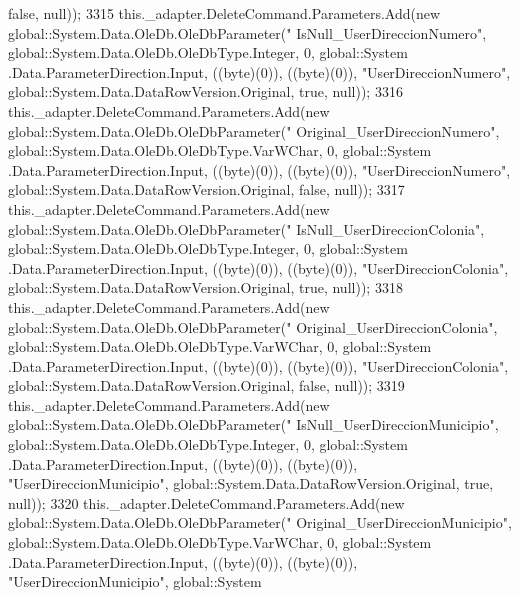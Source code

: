 \begin{DoxyCode}
{      false}, null));
3315             this.\_adapter.DeleteCommand.Parameters.Add(\textcolor{keyword}{new} global::System.Data.OleDb.OleDbParameter(\textcolor{stringliteral}{"
      IsNull\_UserDireccionNumero"}, global::System.Data.OleDb.OleDbType.Integer, 0, global::System
      .Data.ParameterDirection.Input, ((byte)(0)), ((byte)(0)), \textcolor{stringliteral}{"UserDireccionNumero"}, global::System.Data.DataRowVersion.Original, \textcolor{keyword}{true},
       null));
3316             this.\_adapter.DeleteCommand.Parameters.Add(\textcolor{keyword}{new} global::System.Data.OleDb.OleDbParameter(\textcolor{stringliteral}{"
      Original\_UserDireccionNumero"}, global::System.Data.OleDb.OleDbType.VarWChar, 0, global::System
      .Data.ParameterDirection.Input, ((byte)(0)), ((byte)(0)), \textcolor{stringliteral}{"UserDireccionNumero"}, global::System.Data.DataRowVersion.Original, \textcolor{keyword}{
      false}, null));
3317             this.\_adapter.DeleteCommand.Parameters.Add(\textcolor{keyword}{new} global::System.Data.OleDb.OleDbParameter(\textcolor{stringliteral}{"
      IsNull\_UserDireccionColonia"}, global::System.Data.OleDb.OleDbType.Integer, 0, global::System
      .Data.ParameterDirection.Input, ((byte)(0)), ((byte)(0)), \textcolor{stringliteral}{"UserDireccionColonia"}, global::System.Data.DataRowVersion.Original, \textcolor{keyword}{
      true}, null));
3318             this.\_adapter.DeleteCommand.Parameters.Add(\textcolor{keyword}{new} global::System.Data.OleDb.OleDbParameter(\textcolor{stringliteral}{"
      Original\_UserDireccionColonia"}, global::System.Data.OleDb.OleDbType.VarWChar, 0, global::System
      .Data.ParameterDirection.Input, ((byte)(0)), ((byte)(0)), \textcolor{stringliteral}{"UserDireccionColonia"}, global::System.Data.DataRowVersion.Original, \textcolor{keyword}{
      false}, null));
3319             this.\_adapter.DeleteCommand.Parameters.Add(\textcolor{keyword}{new} global::System.Data.OleDb.OleDbParameter(\textcolor{stringliteral}{"
      IsNull\_UserDireccionMunicipio"}, global::System.Data.OleDb.OleDbType.Integer, 0, global::System
      .Data.ParameterDirection.Input, ((byte)(0)), ((byte)(0)), \textcolor{stringliteral}{"UserDireccionMunicipio"}, global::System.Data.DataRowVersion.Original,
       \textcolor{keyword}{true}, null));
3320             this.\_adapter.DeleteCommand.Parameters.Add(\textcolor{keyword}{new} global::System.Data.OleDb.OleDbParameter(\textcolor{stringliteral}{"
      Original\_UserDireccionMunicipio"}, global::System.Data.OleDb.OleDbType.VarWChar, 0, global::System
      .Data.ParameterDirection.Input, ((byte)(0)), ((byte)(0)), \textcolor{stringliteral}{"UserDireccionMunicipio"}, global::System

\end{DoxyCode}
